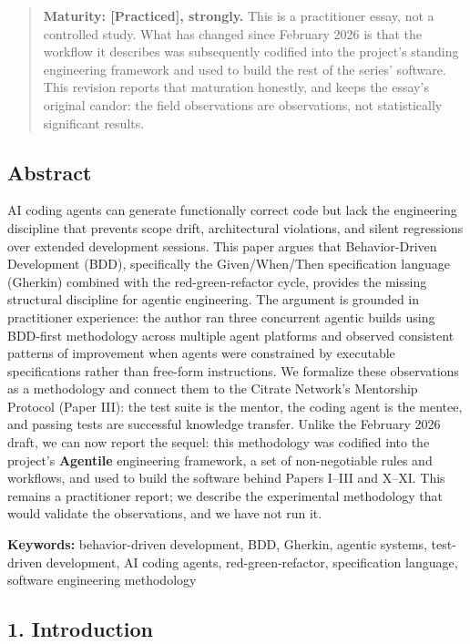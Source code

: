 \begin{quote}
\textbf{Maturity: {[}Practiced{]}, strongly.} This is a practitioner
essay, not a controlled study. What has changed since February 2026 is
that the workflow it describes was subsequently codified into the
project's standing engineering framework and used to build the rest of
the series' software. This revision reports that maturation honestly,
and keeps the essay's original candor: the field observations are
observations, not statistically significant results.
\end{quote}

\subsection{Abstract}\label{abstract}

AI coding agents can generate functionally correct code but lack the
engineering discipline that prevents scope drift, architectural
violations, and silent regressions over extended development sessions.
This paper argues that Behavior-Driven Development (BDD), specifically
the Given/When/Then specification language (Gherkin) combined with the
red-green-refactor cycle, provides the missing structural discipline for
agentic engineering. The argument is grounded in practitioner
experience: the author ran three concurrent agentic builds using
BDD-first methodology across multiple agent platforms and observed
consistent patterns of improvement when agents were constrained by
executable specifications rather than free-form instructions. We
formalize these observations as a methodology and connect them to the
Citrate Network's Mentorship Protocol (Paper III): the test suite is the
mentor, the coding agent is the mentee, and passing tests are successful
knowledge transfer. Unlike the February 2026 draft, we can now report
the sequel: this methodology was codified into the project's
\textbf{Agentile} engineering framework, a set of non-negotiable rules
and workflows, and used to build the software behind Papers I--III and
X--XI. This remains a practitioner report; we describe the experimental
methodology that would validate the observations, and we have not run
it.

\textbf{Keywords:} behavior-driven development, BDD, Gherkin, agentic
systems, test-driven development, AI coding agents, red-green-refactor,
specification language, software engineering methodology

\subsection{1. Introduction}\label{introduction}

